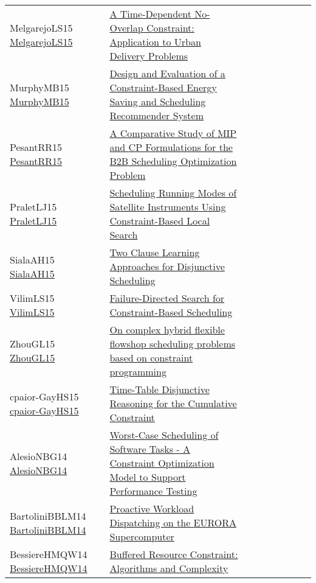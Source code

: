 {\begin{longtable}{p{3cm}p{7cm}lllllll}
MelgarejoLS15 \href{https://doi.org/10.1007/978-3-319-18008-3\_1}{MelgarejoLS15} &  \href{papers/MelgarejoLS15.pdf}{A Time-Dependent No-Overlap Constraint: Application to Urban Delivery Problems} &  &  &  &  &  &  & \\
MurphyMB15 \href{https://doi.org/10.1007/978-3-319-23219-5\_47}{MurphyMB15} &  \href{papers/MurphyMB15.pdf}{Design and Evaluation of a Constraint-Based Energy Saving and Scheduling Recommender System} &  &  &  &  &  &  & \\
PesantRR15 \href{https://doi.org/10.1007/978-3-319-18008-3\_21}{PesantRR15} &  \href{papers/PesantRR15.pdf}{A Comparative Study of {MIP} and {CP} Formulations for the {B2B} Scheduling Optimization Problem} &  &  &  &  &  &  & \\
PraletLJ15 \href{https://doi.org/10.1007/978-3-319-23219-5\_48}{PraletLJ15} &  \href{papers/PraletLJ15.pdf}{Scheduling Running Modes of Satellite Instruments Using Constraint-Based Local Search} &  &  &  &  &  &  & \\
SialaAH15 \href{https://doi.org/10.1007/978-3-319-23219-5\_28}{SialaAH15} &  \href{papers/SialaAH15.pdf}{Two Clause Learning Approaches for Disjunctive Scheduling} &  &  &  &  &  &  & \\
VilimLS15 \href{https://doi.org/10.1007/978-3-319-18008-3\_30}{VilimLS15} &  \href{papers/VilimLS15.pdf}{Failure-Directed Search for Constraint-Based Scheduling} &  &  &  &  &  &  & \\
ZhouGL15 \href{https://doi.org/10.1109/FSKD.2015.7382064}{ZhouGL15} &  \href{papers/ZhouGL15.pdf}{On complex hybrid flexible flowshop scheduling problems based on constraint programming} &  &  &  &  &  &  & \\
cpaior-GayHS15 \href{https://doi.org/10.1007/978-3-319-18008-3\_11}{cpaior-GayHS15} &  \href{papers/cpaior-GayHS15.pdf}{Time-Table Disjunctive Reasoning for the Cumulative Constraint} &  &  &  &  &  &  & \\
AlesioNBG14 \href{https://doi.org/10.1007/978-3-319-10428-7\_58}{AlesioNBG14} &  \href{papers/AlesioNBG14.pdf}{Worst-Case Scheduling of Software Tasks - {A} Constraint Optimization Model to Support Performance Testing} &  &  &  &  &  &  & \\
BartoliniBBLM14 \href{https://doi.org/10.1007/978-3-319-10428-7\_55}{BartoliniBBLM14} &  \href{papers/BartoliniBBLM14.pdf}{Proactive Workload Dispatching on the {EURORA} Supercomputer} &  &  &  &  &  &  & \\
BessiereHMQW14 \href{https://doi.org/10.1007/978-3-319-07046-9\_23}{BessiereHMQW14} &  \href{papers/BessiereHMQW14.pdf}{Buffered Resource Constraint: Algorithms and Complexity} &  &  &  &  &  &  & \\

\end{longtable}}
